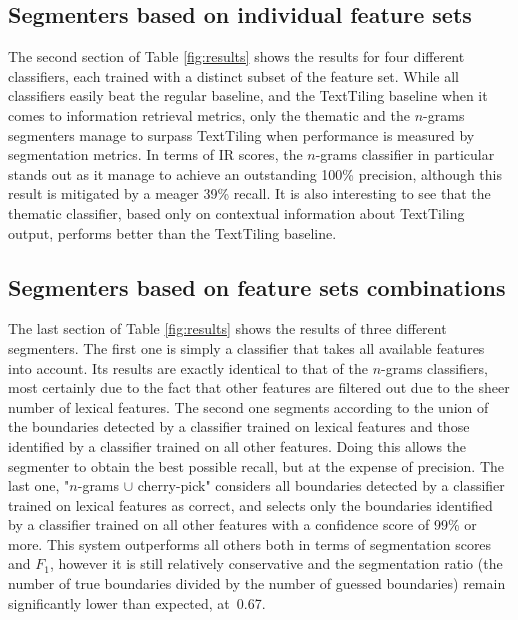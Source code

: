 \subsection{Segmenters based on individual feature sets}

The second section of Table \ref{fig:results} shows the results for four different classifiers, each trained with a distinct subset of the feature set. While all classifiers easily beat the regular baseline, and the TextTiling baseline when it comes to information retrieval metrics, only the thematic and the $n$-grams segmenters manage to surpass TextTiling when performance is measured by segmentation metrics. In terms of IR scores, the $n$-grams classifier in particular stands out as it manage to achieve an outstanding 100\% precision, although this result is mitigated by a meager 39\% recall. It is also interesting to see that the thematic classifier, based only on contextual information about TextTiling output, performs better than the TextTiling baseline.

\subsection{Segmenters based on feature sets combinations}

The last section of Table \ref{fig:results} shows the results of three different segmenters. The first one is simply a classifier that takes all available features into account. Its results are exactly identical to that of the $n$-grams classifiers, most certainly due to the fact that other features are filtered out due to the sheer number of lexical features. The second one segments according to the union of the boundaries detected by a classifier trained on lexical features and those identified by a classifier trained on all other features. Doing this allows the segmenter to obtain the best possible recall, but at the expense of precision. The last one, "$n$-grams $\cup$ cherry-pick"  considers all boundaries detected by a classifier trained on lexical features as correct, and selects only the boundaries identified by a classifier trained on all other features with a confidence score of 99\% or more. This system outperforms all others both in terms of segmentation scores and $F_1$, however it is still relatively conservative and the segmentation ratio (the number of true boundaries divided by the number of guessed boundaries) remain significantly lower than expected, at~0.67.
